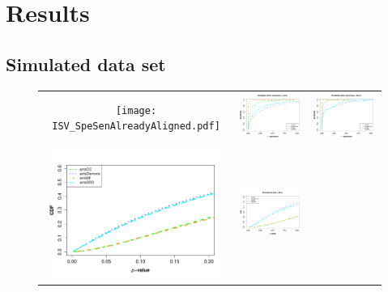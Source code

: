 \documentclass[final,5p,times,twocolumn]{elsarticle}
\begin{document}
\section{Results}

\subsection{Simulated data set} 


\begin{figure}
\begin{center}
\begin{tabular}{ccc}
  \texttt{[image: ISV\_SpeSenAlreadyAligned.pdf]} &
  \includegraphics[width=57mm]{ISV_SpeSenAlreadyAlignedSmooth0.pdf} &
  \includegraphics[width=57mm]{ISV_SpeSenAlreadyAlignedSmooth1.pdf} \\
  \includegraphics[width=57mm]{ISV_CDFAlreadyAligned.pdf} &
  \includegraphics[width=57mm]{ISV_CDFAlreadyAlignedSmooth0.pdf} &

\end{tabular}
\end{center}
\end{figure}
\end{document}
